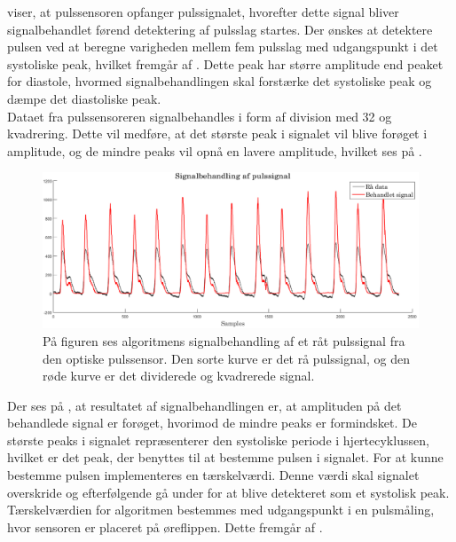  viser, at pulssensoren opfanger pulssignalet, hvorefter dette signal bliver signalbehandlet førend detektering af pulsslag startes. Der ønskes at detektere pulsen ved at beregne varigheden mellem fem pulsslag med udgangspunkt i det systoliske peak, hvilket fremgår af . Dette peak har større amplitude end peaket for diastole, hvormed signalbehandlingen skal forstærke det systoliske peak og dæmpe det diastoliske peak.  \\
Dataet fra pulssensoreren signalbehandles i form af division med 32 og kvadrering. Dette vil medføre, at det største peak i signalet vil blive forøget i amplitude, og de mindre peaks vil opnå en lavere amplitude, hvilket ses på . 
\begin{figure}[H]
	\centering
	\includegraphics[scale=0.37]{figures/cDesign/puls_ore_behandlet.png}
	\caption{På figuren ses algoritmens signalbehandling af et råt pulssignal fra den optiske pulssensor. Den sorte kurve er det rå pulssignal, og den røde kurve er det dividerede og kvadrerede signal.}
	\label{fig:behandlet_puls}
\end{figure}\vspace{-.25cm}
Der ses på , at resultatet af signalbehandlingen er, at amplituden på det behandlede signal er forøget, hvorimod de mindre peaks er formindsket. De største peaks i signalet repræsenterer den systoliske periode i hjertecyklussen, hvilket er det peak, der benyttes til at bestemme pulsen i signalet. For at kunne bestemme pulsen implementeres en tærskelværdi. Denne værdi skal signalet overskride og efterfølgende gå under for at blive detekteret som et systolisk peak. Tærskelværdien for algoritmen bestemmes med udgangspunkt i en pulsmåling, hvor sensoren er placeret på øreflippen. Dette fremgår af .
